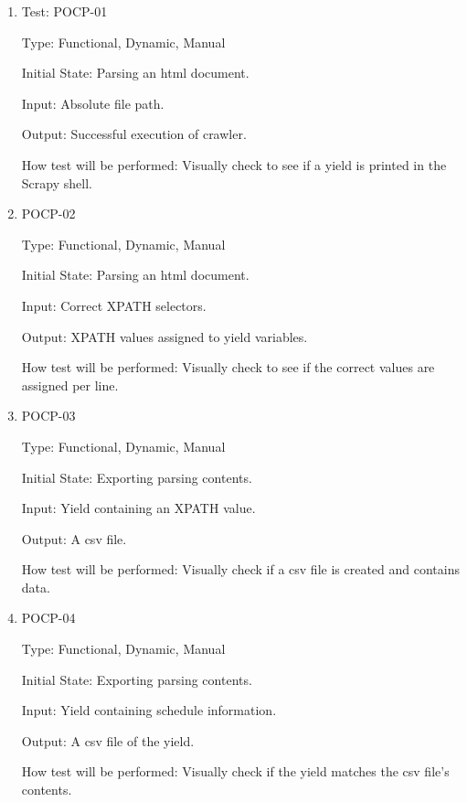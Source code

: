 \documentclass[12pt, titlepage]{article}
\begin{document}
\begin{enumerate}

\item{Test: POCP-01\\}

Type: Functional, Dynamic, Manual
					
Initial State: Parsing an html document.
					
Input: Absolute file path.
					
Output: Successful execution of crawler.
					
How test will be performed: Visually check to see if a yield is printed in the Scrapy shell.

					
\item{POCP-02\\}

Type: Functional, Dynamic, Manual
					
Initial State: Parsing an html document.
					
Input: Correct XPATH selectors.
					
Output: XPATH values assigned to yield variables.
					
How test will be performed: Visually check to see if the correct values are assigned per line.


\item{POCP-03\\}

Type: Functional, Dynamic, Manual
					
Initial State: Exporting parsing contents.
					
Input: Yield containing an XPATH value.
					
Output: A csv file.
					
How test will be performed: Visually check if a csv file is created and contains data.

\item{POCP-04\\}

Type: Functional, Dynamic, Manual
					
Initial State: Exporting parsing contents.
					
Input: Yield containing schedule information.
					
Output: A csv file of the yield.
					
How test will be performed: Visually check if the yield matches the csv file's contents.



\end{enumerate}
\end{document}
